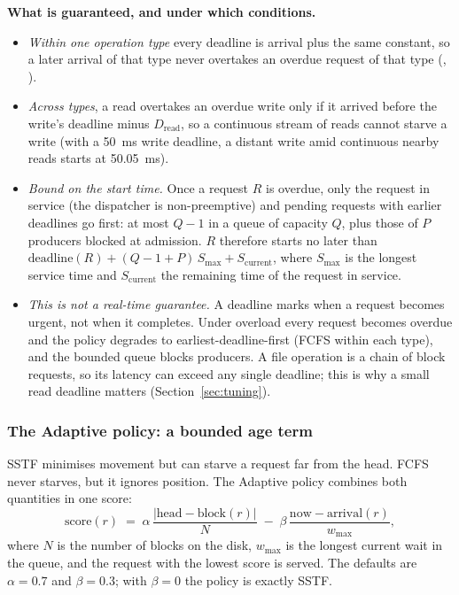 \documentclass[12pt,a4paper]{article}
\DeclareRobustCommand{\code}[1]{\texttt{\detokenize{#1}}}
\begin{document}
\noindent\textbf{What is guaranteed, and under which conditions.}
\begin{itemize}[leftmargin=1.4em]
  \item \emph{Within one operation type} every deadline is arrival plus the same constant, so a later arrival of that type never overtakes an overdue request of that type (\code{test_deadline_order}, \code{test_starvation}).
  \item \emph{Across types}, a read overtakes an overdue write only if it arrived before the write's deadline minus $D_{\text{read}}$, so a continuous stream of reads cannot starve a write (with a 50~ms write deadline, a distant write amid continuous nearby reads starts at 50.05~ms).
  \item \emph{Bound on the start time.} Once a request $R$ is overdue, only the request in service (the dispatcher is non-preemptive) and pending requests with earlier deadlines go first: at most $Q - 1$ in a queue of capacity $Q$, plus those of $P$ producers blocked at admission. $R$ therefore starts no later than $\text{deadline}(R) + (Q - 1 + P)\,S_{\max} + S_{\text{current}}$, where $S_{\max}$ is the longest service time and $S_{\text{current}}$ the remaining time of the request in service.
  \item \emph{This is not a real-time guarantee.} A deadline marks when a request becomes urgent, not when it completes. Under overload every request becomes overdue and the policy degrades to earliest-deadline-first (FCFS within each type), and the bounded queue blocks producers. A file operation is a chain of block requests, so its latency can exceed any single deadline; this is why a small read deadline matters (Section~\ref{sec:tuning}).
\end{itemize}

\subsubsection{The Adaptive policy: a bounded age term}
\label{sec:adaptive}
SSTF minimises movement but can starve a request far from the head. FCFS never starves, but it ignores position. The Adaptive policy combines both quantities in one score:
\begin{equation}
\text{score}(r) \;=\; \alpha \,\frac{|\text{head} - \text{block}(r)|}{N} \;-\; \beta \,\frac{\text{now} - \text{arrival}(r)}{w_{\max}},
\label{eq:adaptive}
\end{equation}
where $N$ is the number of blocks on the disk, $w_{\max}$ is the longest current wait in the queue, and the request with the lowest score is served. The defaults are $\alpha = 0.7$ and $\beta = 0.3$; with $\beta = 0$ the policy is exactly SSTF.
\end{document}
